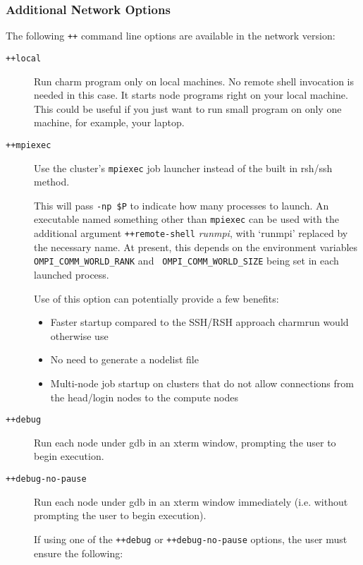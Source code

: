 \subsubsection{Additional Network Options}
\label{network command line options}

The following {\tt ++} command line options are available in
the network version:
\begin{description}

\item[{\tt ++local}] Run charm program only on local machines. No 
 remote shell invocation is needed in this case. It starts node programs 
 right on your local machine. This could be useful if you just want to 
 run small program on only one machine, for example, your laptop.


\item[{\tt ++mpiexec}]

Use the cluster's {\tt mpiexec} job launcher instead of the built in rsh/ssh
method.

This will pass {\tt -np \$P} to indicate how many processes to
launch. An executable named something other than {\tt mpiexec} can be
used with the additional argument {\tt ++remote-shell} {\it runmpi},
with `runmpi' replaced by the necessary name. At present, this depends
on the environment variables {\tt OMPI\_COMM\_WORLD\_RANK} and {\tt
  OMPI\_COMM\_WORLD\_SIZE} being set in each launched process.

Use of this option can potentially provide a few benefits:

\begin{itemize}
\item Faster startup compared to the SSH/RSH approach charmrun would
  otherwise use
\item No need to generate a nodelist file
\item Multi-node job startup on clusters that do not allow connections
  from the head/login nodes to the compute nodes
\end{itemize}

\item[{\tt ++debug}] Run each node under gdb in an xterm window, prompting
the user to begin execution.

\item[{\tt ++debug-no-pause}] Run each node under gdb in an xterm window
immediately (i.e. without prompting the user to begin execution).

If using one of the {\tt ++debug} or {\tt ++debug-no-pause} options,
the user must ensure the following:
\begin{enumerate}


\end{enumerate}
\end{description}
